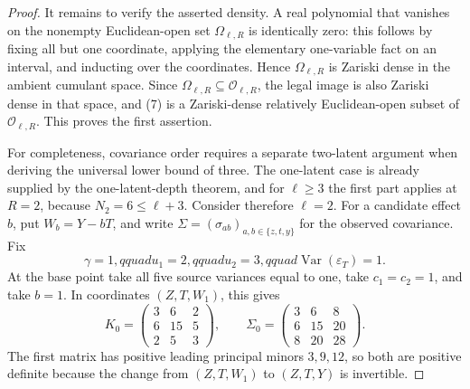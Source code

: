 \documentclass{article}
\begin{document}
\begin{proof}
It remains to verify the asserted density.  A real polynomial that vanishes on the nonempty Euclidean-open set \(\Omega_{\ell,R}\) is identically zero: this follows by fixing all but one coordinate, applying the elementary one-variable fact on an interval, and inducting over the coordinates.  Hence \(\Omega_{\ell,R}\) is Zariski dense in the ambient cumulant space.  Since \(\Omega_{\ell,R}\subseteq\mathcal O_{\ell,R}\), the legal image is also Zariski dense in that space, and (7) is a Zariski-dense relatively Euclidean-open subset of \(\mathcal O_{\ell,R}\).  This proves the first assertion.

For completeness, covariance order requires a separate two-latent argument when deriving the universal lower bound of three.  The one-latent case is already supplied by the one-latent-depth theorem, and for \(\ell\ge3\) the first part applies at \(R=2\), because \(N_2=6\le\ell+3\).  Consider therefore \(\ell=2\).  For a candidate effect \(b\), put \(W_b=Y-bT\), and write \(\Sigma=(\sigma_{ab})_{a,b\in\{z,t,y\}}\) for the observed covariance.  Fix
\[
 \gamma=1,qquad u_1=2,qquad u_2=3,qquad
 \operatorname{Var}(\varepsilon_T)=1.
\]
At the base point take all five source variances equal to one, take \(c_1=c_2=1\), and take \(b=1\).  In coordinates \((Z,T,W_1)\), this gives
\[
 K_0=
 \begin{pmatrix}
 3&6&2\\
 6&15&5\\
 2&5&3
 \end{pmatrix},
\qquad
 \Sigma_0=
 \begin{pmatrix}
 3&6&8\\
 6&15&20\\
 8&20&28
 \end{pmatrix}.
 \tag{11}
\]
The first matrix has positive leading principal minors \(3,9,12\), so both are positive definite because the change from \((Z,T,W_1)\) to \((Z,T,Y)\) is invertible.


\end{proof}
\end{document}
